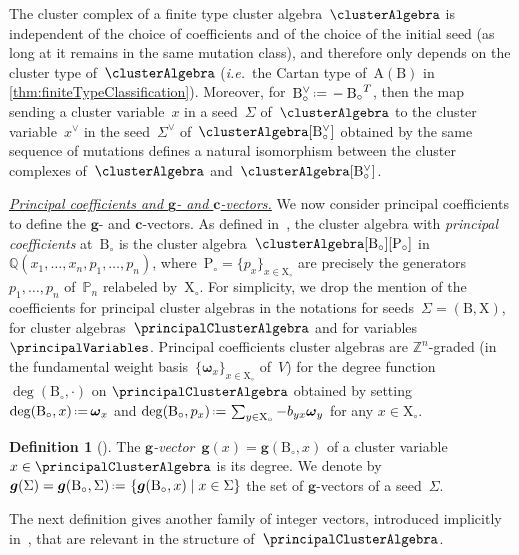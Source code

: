 \documentclass{amsart}
\theoremstyle{definition}
\newtheorem{definition}[theorem]{Definition}
\newcommand{\Q}{\mathbb{Q}} %
\newcommand{\Z}{\mathbb{Z}} %
\renewcommand{\b}[1]{{\boldsymbol{#1}}} %
\newcommand{\set}[2]{\left\{ #1 \;\middle|\; #2 \right\}} %
\newcommand{\eqdef}{\mbox{\,\raisebox{0.2ex}{\scriptsize\ensuremath{\mathrm:}}\ensuremath{=}\,}} %
\newcommand{\transpose}[1]{{#1}^T} %
\newcommand{\ie}{\textit{i.e.}~} %
\newcommand{\darkblue}{\color{darkblue}} %
\newcommand{\defn}[1]{\textsl{\darkblue #1}} %
\newcommand{\para}[1]{\medskip\noindent\uline{\textit{#1.}}} %
\newcommand{\gvector}[1]{\b{g}(#1)} %
\newcommand{\gvectorFull}[2]{\b{g}(#1,#2)} %
\newcommand{\gvectors}[1]{\b{g}(#1)} %
\newcommand{\Trop}[1]{\mathbb{P}_{#1}} %
\newcommand{\seed}{\Sigma} %
\newcommand{\cluster}{\mathrm{X}} %
\newcommand{\coefficients}{\mathrm{P}} %
\newcommand{\B}{\mathrm{B}} %
\newcommand{\A}[1]{\mathrm{A}({#1})} %
\newcommand{\fundamentalWeight}{\b{\omega}} %
\begin{document}
The cluster complex of a finite type cluster algebra~$\clusterAlgebra$ is independent of the choice of coefficients and of the choice of the initial seed (as long at it remains in the same mutation class), and therefore only depends on the cluster type of~$\clusterAlgebra$ (\ie the Cartan type of~$\A{\B}$ in \cref{thm:finiteTypeClassification}).
Moreover, for~$\B_\circ^\vee \eqdef -\transpose{\B_\circ}$, then the map sending a cluster variable~$x$ in a seed~$\seed$ of~$\clusterAlgebra$ to the cluster variable~$x^\vee$ in the seed~$\seed^\vee$ of~$\clusterAlgebra[\B_\circ^\vee]$ obtained by the same sequence of mutations defines a natural isomorphism between the cluster complexes of~$\clusterAlgebra$ and~$\clusterAlgebra[\B_\circ^\vee]$.

\para{Principal coefficients and $\b{g}$- and $\b{c}$-vectors}
%
We now consider principal coefficients to define the $\b{g}$- and $\b{c}$-vectors.
As defined in~\cite[Def.~3.1]{FominZelevinsky-ClusterAlgebrasIV}, the cluster algebra with \defn{principal coefficients} at~$\B_\circ$ is the cluster algebra~$\clusterAlgebra[\B_\circ][\coefficients_\circ]$ in~$\Q(x_1, \dots, x_n, p_1, \dots, p_n)$, where~$\coefficients_\circ = \{p_x\}_{x \in \cluster_\circ}$ are precisely the generators~$p_1, \dots, p_n$ of~$\Trop{n}$ relabeled by~$\cluster_\circ$.
For simplicity, we drop the mention of the coefficients for principal cluster algebras in the notations for seeds~$\seed = (\B, \cluster)$, for cluster algebras~$\principalClusterAlgebra$ and for variables~$\principalVariables$.
Principal coefficients cluster algebras are $\Z^n$-graded (in the fundamental weight basis~$\{\fundamentalWeight_x\}_{x \in \cluster_\circ}$ of~$V$) for the degree function~$\deg(\B_\circ,\cdot)$ on $\principalClusterAlgebra$ obtained by setting
\(
\deg(\B_\circ,  x) \eqdef \fundamentalWeight_x
\)
and
\(
\deg(\B_\circ, p_x) \eqdef \sum_{y \in \cluster_\circ} -b_{yx} \fundamentalWeight_y
\)
for any $x\in\cluster_\circ$.

\begin{definition}[\cite{FominZelevinsky-ClusterAlgebrasIV}]\label{def:gvectorCA}
The \defn{$\b{g}$-vector}~$\gvector{x} = \gvectorFull{\B_\circ}{x}$ of a cluster variable~$x \in \principalClusterAlgebra$ is its degree.
We denote by $\gvectors{\seed} = \gvectorFull{\B_\circ}{\seed} \eqdef \set{\gvectorFull{\B_\circ}{x}}{x \in \seed}$ the set of $\b{g}$-vectors of a seed~$\seed$.
\end{definition}

The next definition gives another family of integer vectors, introduced implicitly in~\cite{FominZelevinsky-ClusterAlgebrasIV}, that are relevant in the structure of~$\principalClusterAlgebra$.
\end{document}

